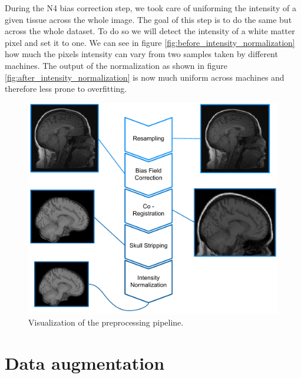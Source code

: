 During the N4 bias correction step, we took care of uniforming the intensity of a given tissue across the whole image. The goal of this step is to do the same but across the whole dataset. To do so we will detect the intensity of a white matter pixel and set it to one. We can see in figure \ref{fig:before_intensity_normalization} how much the pixels intensity can vary from two samples taken by different machines. The output of the normalization as shown in figure \ref{fig:after_intensity_normalization} is now much uniform across machines and therefore less prone to overfitting.

\begin{figure}
    \centering
    \includegraphics[width=1.0\textwidth]{figures/preprocessing/pipeline.pdf}
    \caption{Visualization of the preprocessing pipeline.}
    \label{fig:pipeline}
\end{figure}


\section{Data augmentation}

